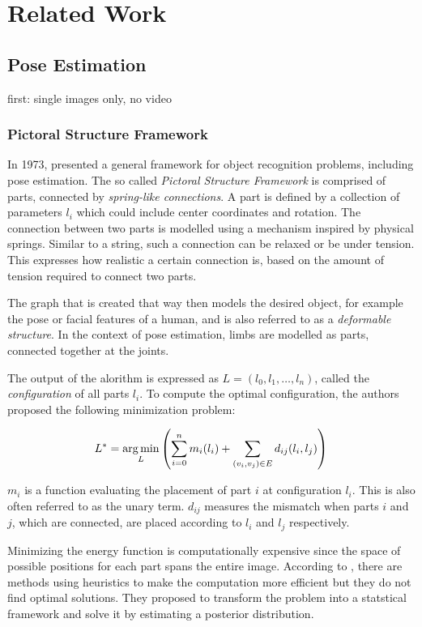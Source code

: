 \chapter{Related Work}

\section{Pose Estimation}
first: single images only, no video
\subsection{Pictoral Structure Framework}
In 1973, \cite{fischler_representation_1973} presented a general framework for object recognition problems, including pose estimation.
The so called \textit{Pictoral Structure Framework} is comprised of parts, connected by \textit{spring-like connections}.
A part is defined by a collection of parameters $l_i$ which could include center coordinates and rotation.
The connection between two parts is modelled using a mechanism inspired by physical springs.
Similar to a string, such a connection can be relaxed or be under tension.
This expresses how realistic a certain connection is, based on the amount of tension required to connect two parts.

The graph that is created that way then models the desired object, for example the pose or facial features of a human, and is also referred to as a \textit{deformable structure}.
In the context of pose estimation, limbs are modelled as parts, connected together at the joints.

The output of the alorithm is expressed as $L = (l_0, l_1, \dots, l_n)$, called the \textit{configuration} of all parts $l_i$.
To compute the optimal configuration, the authors proposed the following minimization problem:

\begin{equation}
    \label{eq:energy-minimization}
    L^* = \operatorname*{arg\,min}_L \left(\sum_{i=0}^n m_i(l_i) + \sum_{(v_i, v_j) \in E} d_{ij}(l_i, l_j)\right)
\end{equation}

$m_i$ is a function evaluating the placement of part $i$ at configuration $l_i$.
This is also often referred to as the unary term.
$d_{ij}$ measures the mismatch when parts $i$ and $j$, which are connected, are placed according to $l_i$ and $l_j$ respectively.

Minimizing the energy function is computationally expensive since the space of possible positions for each part spans the entire image.
According to \cite{felzenszwalb_pictorial_2005}, there are methods using heuristics to make the computation more efficient but they do not find optimal solutions.
They proposed to transform the problem into a statstical framework and solve it by estimating a posterior distribution.

